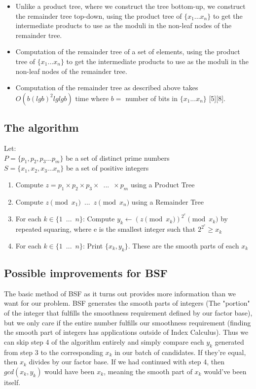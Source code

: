 \documentclass{article}
\begin{document}
\begin{enumerate}
\begin{itemize}
          \item Unlike a product tree, where we construct the tree bottom-up, we construct the remainder tree top-down, using the product tree of $\{x_1 ... x_n\}$ to get the intermediate products to use as the moduli in the non-leaf nodes of the remainder tree.
          \item Computation of the remainder tree of a set of elements, using the product tree of $\{x_1 ... x_n\}$ to get the intermediate products to use as the moduli in the non-leaf nodes of the remainder tree.
          \item Computation of the remainder tree as described above takes $O(b(lgb)^2lglgb)$ time where $b=$ number of bits in $\{x_1 ... x_n\}$ [5][8].
        \end{itemize}
    \end{enumerate}

  \newpage
  \subsection{The algorithm}
    Let: \\
    $P = \{p_1, p_2, p_3... p_m\}$ be a set of distinct prime numbers \\
    $S = \{x_1, x_2, x_3... x_n\}$ be a set of positive integers \\
    \begin{enumerate}
      \item Compute $z = p_1 \times p_2 \times p_3 \times \enspace ... \enspace \times p_m$ using a Product Tree
      \item Compute $z \pmod {x_1} \enspace ... \enspace z \pmod {x_n}$ using a Remainder Tree
      \item For each $k \in \{1 \enspace ... \enspace n\}$: Compute $y_k \gets (z \pmod {x_k})^{2^e} \pmod {x_k}$ by repeated squaring, where e is the smallest integer such that $2^{2^e} \geq x_k$
      \item For each $k \in \{1 \enspace ... \enspace n\}$: Print $\{x_k, y_k\}$.  These are the smooth parts of each $x_k$
    \end{enumerate}

  \subsection{Possible improvements for BSF}
  The basic method of BSF as it turns out provides more information than we want for our problem.  BSF generates the smooth parts of integers (The "portion" of the integer that fulfills the smoothness requirement defined by our factor base), but we only care if the entire number fulfills our smoothness requirement (finding the smooth part of integers has applications outside of Index Calculus).  Thus we can skip step 4 of the algorithm entirely and simply compare each $y_k$ generated from step 3 to the corresponding $x_k$ in our batch of candidates.  If they're equal, then $x_k$ divides by our factor base.  If we had continued with step 4, then $gcd(x_k, y_k)$ would have been $x_k$, meaning the smooth part of $x_k$ would've been itself.
\end{document}
